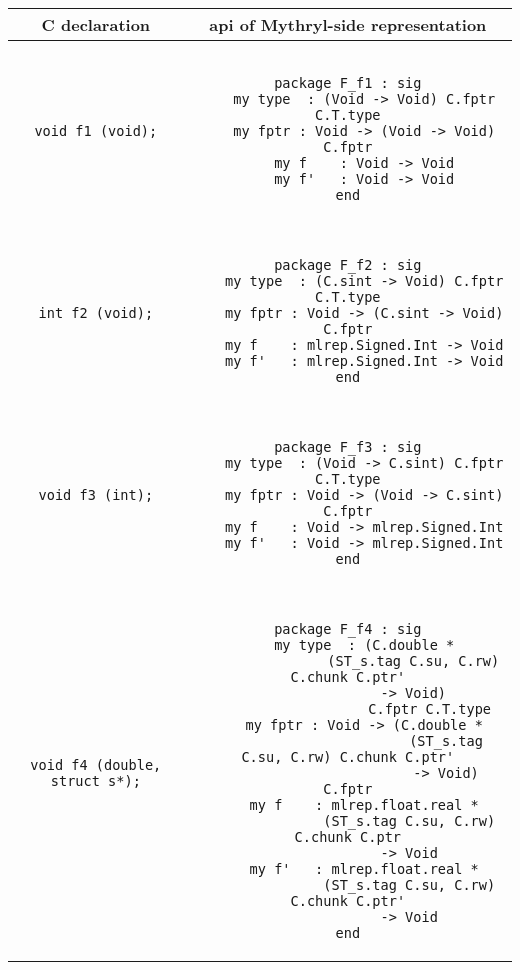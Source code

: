 \begin{small}
\begin{center}
\begin{tabular}{c|c}
C declaration & api of Mythryl-side representation \\ \hline\hline
{\tt void f1 (void);}
&
\begin{minipage}{4in}
\begin{verbatim}

package F_f1 : sig
    my type  : (Void -> Void) C.fptr C.T.type
    my fptr : Void -> (Void -> Void) C.fptr
    my f    : Void -> Void
    my f'   : Void -> Void
end

\end{verbatim}
\end{minipage}
\\ \hline
{\tt int f2 (void);}
&
\begin{minipage}{4in}
\begin{verbatim}

package F_f2 : sig
    my type  : (C.sint -> Void) C.fptr C.T.type
    my fptr : Void -> (C.sint -> Void) C.fptr
    my f    : mlrep.Signed.Int -> Void
    my f'   : mlrep.Signed.Int -> Void
end

\end{verbatim}
\end{minipage}
\\ \hline
{\tt void f3 (int);}
&
\begin{minipage}{4in}
\begin{verbatim}

package F_f3 : sig
    my type  : (Void -> C.sint) C.fptr C.T.type
    my fptr : Void -> (Void -> C.sint) C.fptr
    my f    : Void -> mlrep.Signed.Int
    my f'   : Void -> mlrep.Signed.Int
end

\end{verbatim}
\end{minipage}
\\ \hline
{\tt void f4 (double, struct s*);}
&
\begin{minipage}{4in}
\begin{verbatim}

package F_f4 : sig
    my type  : (C.double *
                (ST_s.tag C.su, C.rw) C.chunk C.ptr'
                -> Void)
                    C.fptr C.T.type
    my fptr : Void -> (C.double *
                        (ST_s.tag C.su, C.rw) C.chunk C.ptr'
                        -> Void) C.fptr
    my f    : mlrep.float.real *
               (ST_s.tag C.su, C.rw) C.chunk C.ptr
               -> Void
    my f'   : mlrep.float.real *
               (ST_s.tag C.su, C.rw) C.chunk C.ptr'
               -> Void
end

\end{verbatim}
\end{minipage}
\end{tabular}
\end{center}
\end{small}

